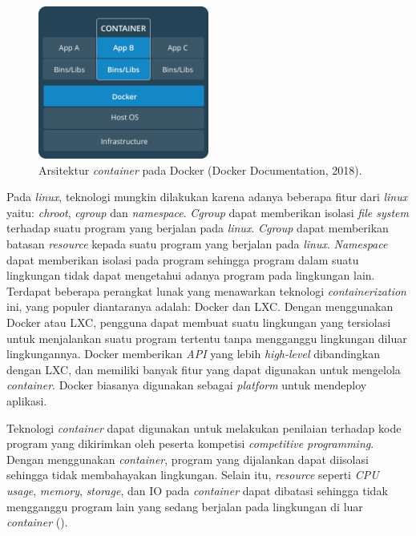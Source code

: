 \begin{figure}
	\centering
	\includegraphics[width=0.5\textwidth]{images/docker-architecture}
	\caption{Arsitektur \textit{container} pada Docker (Docker Documentation, 2018).}
	\label{fig:docker-architecture}
\end{figure}

\par Pada \textit{linux}, teknologi mungkin dilakukan karena adanya beberapa fitur dari \textit{linux} yaitu: \textit{chroot}, \textit{cgroup} dan \textit{namespace}. \textit{Cgroup} dapat memberikan isolasi \textit{file system} terhadap suatu program yang berjalan pada \textit{linux}. \textit{Cgroup} dapat memberikan batasan \textit{resource} kepada suatu program yang berjalan pada \textit{linux}. \textit{Namespace} dapat memberikan isolasi pada program sehingga program dalam suatu lingkungan tidak dapat mengetahui adanya program pada lingkungan lain. Terdapat beberapa perangkat lunak yang menawarkan teknologi \textit{containerization} ini, yang populer diantaranya adalah: Docker dan LXC. Dengan menggunakan Docker atau LXC, pengguna dapat membuat suatu lingkungan yang tersiolasi untuk menjalankan suatu program tertentu tanpa mengganggu lingkungan diluar lingkungannya. Docker memberikan \textit{API} yang lebih \textit{high-level} dibandingkan dengan LXC, dan memiliki banyak fitur yang dapat digunakan untuk mengelola \textit{container}. Docker biasanya digunakan sebagai \textit{platform} untuk mendeploy aplikasi.

\par Teknologi \textit{container} dapat digunakan untuk melakukan penilaian terhadap kode program yang dikirimkan oleh peserta kompetisi \textit{competitive programming}. Dengan menggunakan \textit{container}, program yang dijalankan dapat diisolasi sehingga tidak membahayakan lingkungan. Selain itu, \textit{resource} seperti \textit{CPU usage}, \textit{memory}, \textit{storage}, dan IO pada \textit{container} dapat dibatasi sehingga tidak mengganggu program lain yang sedang berjalan pada lingkungan di luar \textit{container} (\cite{merkeldocker}).


